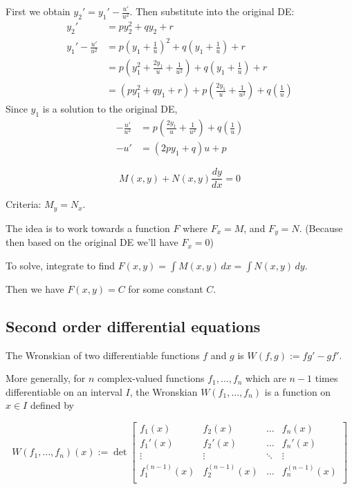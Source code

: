 \begin{compute}
	First we obtain $\displaystyle y_2'=y_1'-\frac{u'}{u^2}$. Then substitute into the original DE:
	\begin{align*}
		y_2' & = py_2^2+qy_2+r                                                                  \\
		y_1'-\frac{u'}{u^2}
		     & = p\left(y_1+\frac1u\right)^2+q\left(y_1+\frac1u\right)+r                        \\
		     & = p\left(y_1^2+\frac{2y_1}{u}+\frac1{u^2}\right)+q\left(y_1+\frac1u\right)+r     \\
		     & = (py_1^2+qy_1+r)+p\left(\frac{2y_1}{u}+\frac1{u^2}\right)+q\left(\frac1u\right)
	\end{align*}
	Since $y_1$ is a solution to the original DE,
	\begin{align*}
		-\frac{u'}{u^2} & = p\left(\frac{2y_1}{u}+\frac1{u^2}\right)+q\left(\frac1u\right) \\
		-u'             & =(2py_1+q)u+p
	\end{align*}
	\QED
\end{compute}


$$M(x,y)+N(x,y)\frac{dy}{dx}=0$$

Criteria: $M_y=N_x$.

The idea is to work towards a function $F$ where $F_x=M$, and $F_y=N$.
(Because then based on the original DE we'll have $F_x=0$)

To solve, integrate to find $F(x,y)=\int M(x,y)\,dx=\int N(x,y)\,dy$.

Then we have $F(x,y)=C$ for some constant $C$.

\subsection{Second order differential equations}

\label{b70073b}

The Wronskian of two differentiable functions $f$ and $g$ is
$W(f,g):=fg'-gf'$.

More generally, for $n$ complex-valued functions $f_1,\ldots,f_n$
which are $n-1$ times differentiable on an interval $I$, the Wronskian
$W(f_1,\ldots,f_n)$ is a function on $x\in I$ defined by

$$
	W(f_1,\ldots,f_n)(x):=\det\begin{bmatrix}
		f_1(x)         & f_2(x)         & \ldots & f_n(x)         \\
		f_1'(x)        & f_2'(x)        & \ldots & f_n'(x)        \\
		\vdots         & \vdots         & \ddots & \vdots         \\
		f_1^{(n-1)}(x) & f_2^{(n-1)}(x) & \ldots & f_n^{(n-1)}(x) \\
	\end{bmatrix}
$$

